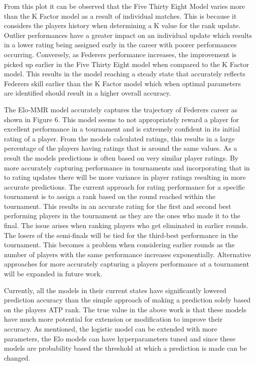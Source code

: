\documentclass[12pt,a4paper]{article}
\begin{document}
From this plot it can be observed that the Five Thirty Eight Model varies more than the
K Factor model as a result of individual matches. This is because it considers the players
history when determining a K value for the rank update. Outlier performances have a greater
impact on an individual update which results in a lower rating being assigned early in the
career with poorer performances occurring. Conversely, as Federers performance increases,
the improvement is picked up earlier in the Five Thirty Eight model when compared to the
K Factor model. This results in the model reaching a steady state that accurately reflects
Federers skill earlier than the K Factor model which when optimal parameters are identified
should result in a higher overall accuracy.

The Elo-MMR model accurately captures the trajectory of Federers career as shown in Figure 6.
This model seems to not appropriately reward a player for excellent performance in a tournament
and is extremely confident in its initial rating of a player. From the models calculated
ratings, this results in a large percentage of the players having ratings that is around
the same values. As a result the models predictions is often based on very similar player
ratings. By more accurately capturing performance in tournaments and incorporating that
in to rating updates there will be more variance in player ratings resulting in more
accurate predictions. The current approach for rating performance for a specific tournament
is to assign a rank based on the round reached within the tournament. This results in an
accurate rating for the first and second best performing players in the tournament as they
are the ones who made it to the final. The issue arises when ranking players who get eliminated
in earlier rounds. The losers of the semi-finals will be tied for the third-best performance
in the tournament. This becomes a problem when considering earlier rounds as the number of
players with the same performance increases exponentially. Alternative approaches for more
accurately capturing a players performance at a tournament will be expanded in future work.

Currently, all the models in their current states have significantly lowered prediction accuracy
than the simple approach of making a prediction solely based on the players ATP rank.
The true value in the above work is that these models have much more potential for extension
or modification to improve their accuracy. As mentioned, the logistic model can be
extended with more parameters, the Elo models can have hyperparameters tuned and since
these models are probability based the threshold at which a prediction is made can be
changed.
\end{document}
